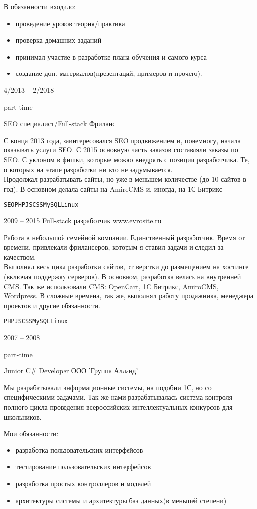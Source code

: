 \begin{entrylist}
{    В обязанности входило:
    \small\begin{itemize}
      \item проведение уроков теория/практика
      \item проверка домашних заданий
      \item принимал участие в разработке плана обучения и самого курса
      \item создание доп. материалов(презентаций, примеров и прочего).
    \end{itemize}
    }

	\entry
		{4/2013 -- 2/2018

		\footnotesize{part-time}}
		{SEO специалист/Full-stack}
		{Фриланс}
		{С конца 2013 года, заинтересовался SEO продвижением и, понемногу, начала оказывать услуги SEO.
		С 2015 основную часть заказов составляли заказы по SEO. С уклоном в фишки, которые можно внедрять с позиции разработчика. Те, о которых на этапе разработки ни кто не задумывается.\\
		Продолжал разрабатывать сайты, но уже в меньшем количестве (до 10 сайтов в год). В основном делала сайты на AmiroCMS и, иногда, на 1С Битрикс

		\texttt{SEO}\slashsep\texttt{PHP}\slashsep\texttt{JS}\slashsep\texttt{CSS}\slashsep\texttt{MySQL}\slashsep\texttt{Linux}}

  \entry
    {2009 -- 2015}
    {Full-stack разработчик}
    {www.evrosite.ru}
    {Работа в небольшой семейной компании. Единственный разработчик. Время от времени, привлекали фрилансеров, которым я ставил задачи и следил за качеством.\\
    Выполнял весь цикл разработки сайтов, от верстки до размещением на хостинге (включая поддержку серверов). В основном, разработка велась на внутренней CMS. Так же использовали CMS: OpenCart, 1C Битрикс, AmiroCMS, Wordpress. В сложные времена, так же, выполнял работу продажника, менеджера проектов и другие обязанности.

    \texttt{PHP}\slashsep\texttt{JS}\slashsep\texttt{CSS}\slashsep\texttt{MySQL}\slashsep\texttt{Linux}}

	\entry
		{2007 -- 2008

		\footnotesize{part-time}}
		{Junior C\# Developer}
		{ООО 'Группа Алланд'}
		{Мы разрабатывали информационные системы, на подобии 1С, но со специфическими задачами. Так же нами разрабатывалась система контроля полного цикла проведения всероссийских интеллектуальных конкурсов для школьников.

    Мои обязанности:
    \begin{itemize}
      \item разработка пользовательских интерфейсов
      \item тестирование пользовательских интерфейсов
      \item разработка простых контроллеров и моделей
      \item архитектуры системы и архитектуры баз данных(в меньшей степени)
    \end{itemize}

}
\end{entrylist}
